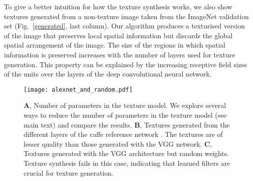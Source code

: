 \documentclass{article} %
\begin{document}
To give a better intuition for how the texture synthesis works, we also show textures generated from a non-texture image taken from the ImageNet validation set \cite{russakovsky_imagenet_2014} (Fig.~\ref{generated}, last column). Our algorithm produces a texturised version of the image that preserves local spatial information but discards the global spatial arrangement of the image. The size of the regions in which spatial information is preserved increases with the number of layers used for texture generation. This property can be explained by the increasing receptive field sizes of the units over the layers of the deep convolutional neural network.  

\begin{figure}[]
\begin{center}
\texttt{[image: alexnet\_and\_random.pdf]}%
\end{center}
\caption{\label{alexnet_and_random}\textbf{A}, Number of parameters in the texture model. We explore several ways to reduce the number of parameters in the texture model (see main text) and compare the results. \textbf{B}, Textures generated from the different layers of the caffe reference network \cite{jia_caffe:_2014,krizhevsky_imagenet_2012}. The textures are of lesser quality than those generated with the VGG network. \textbf{C}, Textures generated with the VGG architecture but random weights. Texture synthesis fails in this case, indicating that learned filters are crucial for texture generation.}
\end{figure}
\end{document}
